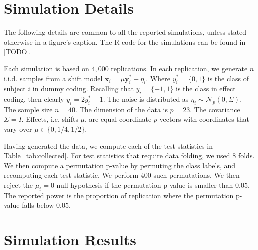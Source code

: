 \documentclass[12pt,a4paper]{article}
\theoremstyle{definition}
\newcommand{\set}[1]{\{ #1 \}} %
\newcommand{\rv}[1]{\mathbf{#1}} %
\newcommand{\x}{\rv x} %
\newcommand{\y}{\rv y} %
\newcommand{\gaussp}[2]{\mathcal{N}_{#1}\left(#2\right)} %
\newcommand{\R}{\textsf{R }}
\begin{document}
\newpage
\section{Simulation Details}
\label{apx:simulation_details}

The following details are common to all the reported simulations, unless stated otherwise in a figure's caption. 
The \R code for the simulations can be found in [TODO].

Each simulation is based on $4,000$ replications. 
In each replication, we generate $n$ i.i.d. samples from a shift model $\x_i = \mu \y^*_i + \eta_i$.
Where $y^*_i=\set{0,1}$ is the class of subject $i$ in dummy coding. 
Recalling that $y_i=\set{-1,1}$ is the class in effect coding, then clearly $y_i=2 y^*_i-1$.
The noise is distributed as $\eta_i \sim \gaussp{p}{0,\Sigma}$. 
The sample size $n=40$. 
The dimension of the data is $p=23$. 
The covariance $\Sigma=I$. 
Effects, i.e. shifts $\mu$, are equal coordinate $p$-vectors with coordinates that vary over $\mu \in \set{0,1/4,1/2}$.

Having generated the data, we compute each of the test statistics in Table~\ref{tab:collected}.
For test statistics that require data folding, we used $8$ folds. 
We then compute a permutation p-value by permuting the class labels, and recomputing each test statistic. 
We perform $400$ such permutations. 
We then reject the $\mu_i=0$ null hypothesis if the permutation p-value is smaller than $0.05$.
The reported power is the proportion of replication where the permutation p-value falls below $0.05$.




\newpage
\section{Simulation Results}
\label{apx:simulations}
\end{document}
